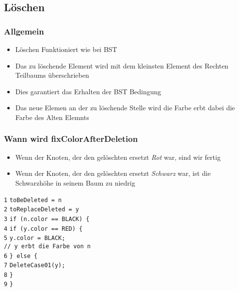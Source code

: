 	\vspace{2cm}
	\subsection{Löschen}
		\subsubsection{Allgemein}
			\begin{itemize}
				\item Löschen Funktioniert wie bei BST
				\item Das zu löschende Element wird mit dem kleinsten Element des Rechten Teilbaums überschrieben
				\item Dies garantiert das Erhalten der BST Bedingung
				\item Das neue Elemen an der zu löschende Stelle wird die Farbe erbt dabei die Farbe des Alten Elemnts
			\end{itemize}

		\subsubsection{Wann wird fixColorAfterDeletion }
			\begin{minipage}[t]{0.5\textwidth}
				\begin{itemize}
					\item Wenn der Knoten, der den gelöschten ersetzt \textit{Rot} war, sind wir fertig
					\item Wenn der Knoten, der den gelöschten ersetzt \textit{Schwarz} war, ist die Schwarzhöhe in seinem Baum zu niedrig 
				\end{itemize}
			\end{minipage}
			\hspace{2cm}
			\begin{minipage}[t]{0.35\textwidth}
				\texttt{1} \texttt{toBeDeleted = n} \\
				\texttt{2} \texttt{toReplaceDeleted = y} \\
				\texttt{3} \texttt{if (n.color == BLACK) \{} \\
				\texttt{4} \hspace{0.4cm} \texttt{if (y.color == RED) \{} \\
				\texttt{5} \hspace{0.8cm} 		\texttt{y.color = BLACK;} \\ 
												\texttt{// y erbt die Farbe von n} \\
				\texttt{6} \hspace{0.4cm} \texttt{\} else \{} \\
				\texttt{7} \hspace{0.8cm} \texttt{DeleteCase01(y);} \\
				\texttt{8} \hspace{0.4cm} \texttt{\}} \\
				\texttt{9} \texttt{\}}
			\end{minipage}



